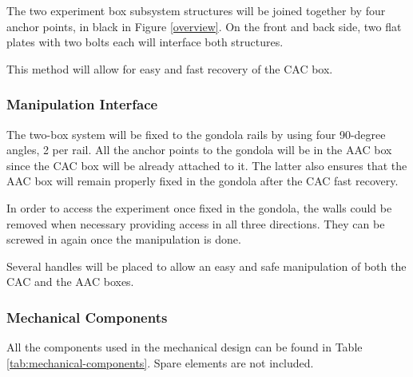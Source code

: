 The two experiment box subsystem structures will be joined together by four anchor points, in black in Figure \ref{overview}. On the front and back side, two flat plates with two bolts each will interface both structures. 

This method will allow for easy and fast recovery of the CAC box. 
 



\subsubsection{Manipulation Interface}

The two-box system will be fixed to the gondola rails by using four 90-degree angles, 2 per rail. All the anchor points to the gondola will be in the AAC box since the CAC box will be already attached to it. The latter also ensures that the AAC box will remain properly fixed in the gondola after the CAC fast recovery. 

\smallskip
In order to access the experiment once fixed in the gondola, the walls could be removed when necessary providing access in all three directions. They can be screwed in again once the manipulation is done.


Several handles will be placed to allow an easy and safe manipulation of both the CAC and the AAC boxes. 


\subsubsection{Mechanical Components}

All the components used in the mechanical design can be found in Table \ref{tab:mechanical-components}. Spare elements are not included. 


\raggedbottom
